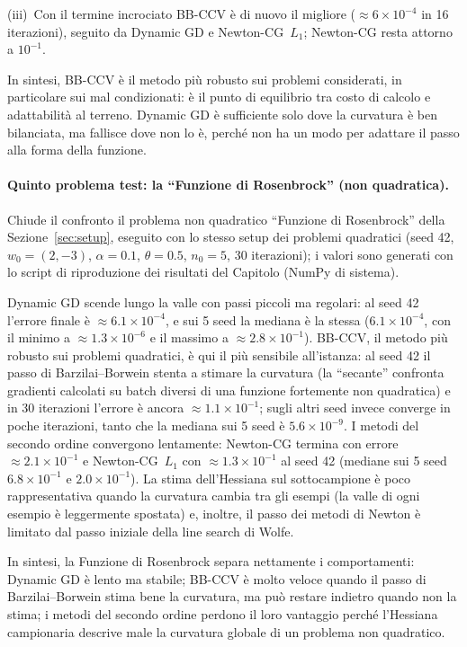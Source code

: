 \documentclass[a4paper,12pt]{article}
\numberwithin{equation}{section}
\numberwithin{figure}{section}
\numberwithin{table}{section}
\begin{document}
(iii)~Con il termine incrociato BB-CCV è di nuovo il migliore
($\approx 6\times10^{-4}$ in 16 iterazioni), seguito da Dynamic GD e
Newton-CG~$L_1$; Newton-CG resta attorno a $10^{-1}$.

In sintesi, BB-CCV è il metodo più robusto sui problemi considerati, in
particolare sui mal condizionati: è il punto di equilibrio tra costo di
calcolo e adattabilità al terreno. Dynamic GD è sufficiente solo dove la
curvatura è ben bilanciata, ma fallisce dove non lo è, perché non ha un modo
per adattare il passo alla forma della funzione.

\paragraph{Quinto problema test: la ``Funzione di Rosenbrock'' (non quadratica).}
Chiude il confronto il problema non quadratico ``Funzione di Rosenbrock''
della Sezione~\ref{sec:setup}, eseguito con lo stesso setup dei problemi
quadratici (seed 42, $w_0=(2,-3)$, $\alpha=0.1$, $\theta=0.5$, $n_0=5$, 30
iterazioni); i valori sono generati con lo script di riproduzione dei
risultati del Capitolo (NumPy di sistema).

Dynamic GD scende lungo la valle con passi piccoli ma regolari: al seed 42
l'errore finale è $\approx6.1\times10^{-4}$, e sui 5 seed la mediana è la
stessa ($6.1\times10^{-4}$, con il minimo a $\approx1.3\times10^{-6}$ e il
massimo a $\approx2.8\times10^{-1}$). BB-CCV, il metodo più robusto sui
problemi quadratici, è qui il più sensibile all'istanza: al seed 42 il passo
di Barzilai--Borwein stenta a stimare la curvatura (la ``secante''
confronta gradienti calcolati su batch diversi di una funzione fortemente non
quadratica) e in 30 iterazioni l'errore è ancora $\approx1.1\times10^{-1}$;
sugli altri seed invece converge in poche iterazioni, tanto che la mediana sui
5 seed è $5.6\times10^{-9}$. I metodi del secondo ordine convergono
lentamente: Newton-CG termina con errore $\approx2.1\times10^{-1}$ e
Newton-CG~$L_1$ con $\approx1.3\times10^{-1}$ al seed 42 (mediane sui 5 seed
$6.8\times10^{-1}$ e $2.0\times10^{-1}$). La stima dell'Hessiana sul
sottocampione è poco rappresentativa quando la curvatura cambia tra gli esempi
(la valle di ogni esempio è leggermente spostata) e, inoltre, il passo dei
metodi di Newton è limitato dal passo iniziale della line search di Wolfe.

In sintesi, la Funzione di Rosenbrock separa nettamente i comportamenti: Dynamic GD è lento ma
stabile; BB-CCV è molto veloce quando il passo di Barzilai--Borwein stima bene
la curvatura, ma può restare indietro quando non la stima; i metodi del secondo
ordine perdono il loro vantaggio perché l'Hessiana campionaria descrive male
la curvatura globale di un problema non quadratico.
\end{document}
